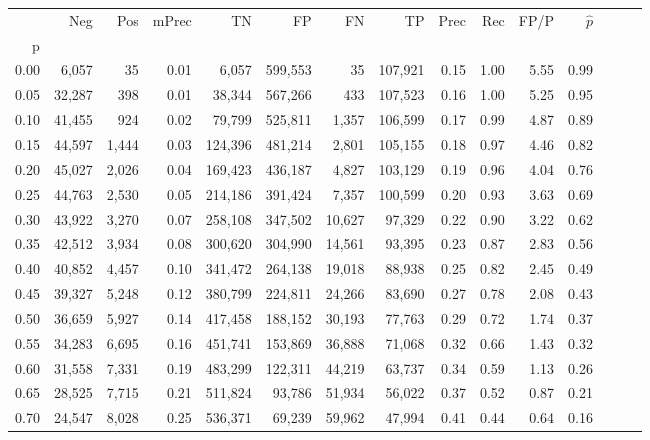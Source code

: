 \begin{tabular}{rrrrrrrrrrrrrrr}
\toprule
{} &     Neg &    Pos & mPrec &       TN &       FP &       FN &       TP &  Prec &   Rec &  FP/P & $\hat{p}$ \\
p    &         &        &       &          &          &          &          &       &       &       &           \\
\midrule
0.00 &   6,057 &     35 &  0.01 &    6,057 &  599,553 &       35 &  107,921 &  0.15 &  1.00 &  5.55 &      0.99 \\
0.05 &  32,287 &    398 &  0.01 &   38,344 &  567,266 &      433 &  107,523 &  0.16 &  1.00 &  5.25 &      0.95 \\
0.10 &  41,455 &    924 &  0.02 &   79,799 &  525,811 &    1,357 &  106,599 &  0.17 &  0.99 &  4.87 &      0.89 \\
0.15 &  44,597 &  1,444 &  0.03 &  124,396 &  481,214 &    2,801 &  105,155 &  0.18 &  0.97 &  4.46 &      0.82 \\
0.20 &  45,027 &  2,026 &  0.04 &  169,423 &  436,187 &    4,827 &  103,129 &  0.19 &  0.96 &  4.04 &      0.76 \\
0.25 &  44,763 &  2,530 &  0.05 &  214,186 &  391,424 &    7,357 &  100,599 &  0.20 &  0.93 &  3.63 &      0.69 \\
0.30 &  43,922 &  3,270 &  0.07 &  258,108 &  347,502 &   10,627 &   97,329 &  0.22 &  0.90 &  3.22 &      0.62 \\
0.35 &  42,512 &  3,934 &  0.08 &  300,620 &  304,990 &   14,561 &   93,395 &  0.23 &  0.87 &  2.83 &      0.56 \\
0.40 &  40,852 &  4,457 &  0.10 &  341,472 &  264,138 &   19,018 &   88,938 &  0.25 &  0.82 &  2.45 &      0.49 \\
0.45 &  39,327 &  5,248 &  0.12 &  380,799 &  224,811 &   24,266 &   83,690 &  0.27 &  0.78 &  2.08 &      0.43 \\
0.50 &  36,659 &  5,927 &  0.14 &  417,458 &  188,152 &   30,193 &   77,763 &  0.29 &  0.72 &  1.74 &      0.37 \\
0.55 &  34,283 &  6,695 &  0.16 &  451,741 &  153,869 &   36,888 &   71,068 &  0.32 &  0.66 &  1.43 &      0.32 \\
0.60 &  31,558 &  7,331 &  0.19 &  483,299 &  122,311 &   44,219 &   63,737 &  0.34 &  0.59 &  1.13 &      0.26 \\
0.65 &  28,525 &  7,715 &  0.21 &  511,824 &   93,786 &   51,934 &   56,022 &  0.37 &  0.52 &  0.87 &      0.21 \\
0.70 &  24,547 &  8,028 &  0.25 &  536,371 &   69,239 &   59,962 &   47,994 &  0.41 &  0.44 &  0.64 &      0.16 \\

\end{tabular}
